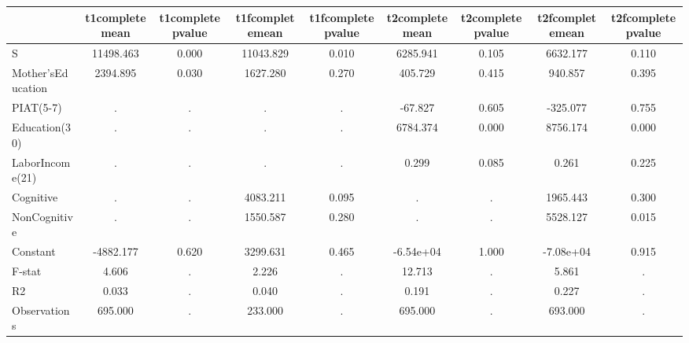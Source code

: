 \begin{table}[htbp]
\begin{tabular}{lcccccccc} \hline \hline
 & t1completemean  & t1completepvalue  & t1fcompletemean  & t1fcompletepvalue  & t2completemean  & t2completepvalue  & t2fcompletemean  & t2fcompletepvalue  \\  \hline 
S & 11498.463 &     0.000 & 11043.829 &     0.010 &  6285.941 &     0.105 &  6632.177 &     0.110 \\  
Mother'sEducation &  2394.895 &     0.030 &  1627.280 &     0.270 &   405.729 &     0.415 &   940.857 &     0.395 \\  
PIAT(5-7) &         . &         . &         . &         . &   -67.827 &     0.605 &  -325.077 &     0.755 \\  
Education(30) &         . &         . &         . &         . &  6784.374 &     0.000 &  8756.174 &     0.000 \\  
LaborIncome(21) &         . &         . &         . &         . &     0.299 &     0.085 &     0.261 &     0.225 \\  
Cognitive &         . &         . &  4083.211 &     0.095 &         . &         . &  1965.443 &     0.300 \\  
NonCognitive &         . &         . &  1550.587 &     0.280 &         . &         . &  5528.127 &     0.015 \\  
Constant & -4882.177 &     0.620 &  3299.631 &     0.465 & -6.54e+04 &     1.000 & -7.08e+04 &     0.915 \\  
F-stat &     4.606 &         . &     2.226 &         . &    12.713 &         . &     5.861 &         . \\  
R2 &     0.033 &         . &     0.040 &         . &     0.191 &         . &     0.227 &         . \\  
Observations &   695.000 &         . &   233.000 &         . &   695.000 &         . &   693.000 &         . \\  
\hline \hline \end{tabular}
\end{table}
